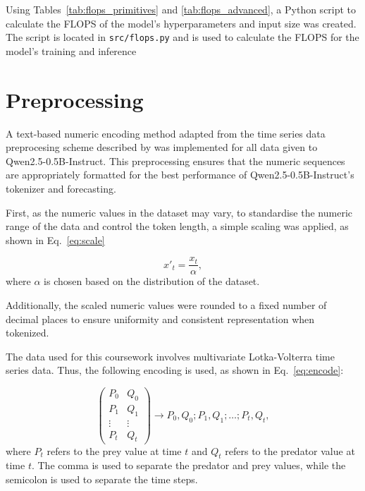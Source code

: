 \documentclass[11pt,a4paper]{article}
\begin{document}
Using Tables~\ref{tab:flops_primitives} and \ref{tab:flops_advanced}, a Python script to calculate the FLOPS of the model's hyperparameters and input size was created. The script is located in \texttt{src/flops.py} and is used to calculate the FLOPS for the model's training and inference 

\section{Preprocessing}
\label{zero}
A text-based numeric encoding method adapted from the time series data preprocesing scheme described by \citeauthor{gruver2024largelanguagemodelszeroshot} was implemented for all data given to Qwen2.5-0.5B-Instruct. This preprocessing ensures that the numeric sequences are appropriately formatted for the best performance of Qwen2.5-0.5B-Instruct's tokenizer and forecasting.

First, as the numeric values in the dataset may vary, to standardise the numeric range of the data and control the token length, a simple scaling was applied, as shown in Eq.~\ref{eq:scale}

\begin{equation}
    x'_t = \frac{x_t}{\alpha},
    \label{eq:scale}
\end{equation}
where $\alpha$ is chosen based on the distribution of the dataset.

Additionally, the scaled numeric values were rounded to a fixed number of decimal places to ensure uniformity and consistent representation when tokenized.

The data used for this coursework involves multivariate Lotka-Volterra time series data. Thus, the following encoding is used, as shown in Eq.~\ref{eq:encode}:

\begin{equation}
    \begin{pmatrix}
        P_0 & Q_0 \\
        P_1 & Q_1 \\
        \vdots & \vdots \\
        P_t & Q_t 
        \end{pmatrix}  
        \rightarrow P_0,Q_0;P_{1},Q_{1};\ldots;P_{t},Q_{t},
    \label{eq:encode}
\end{equation}
where $P_t$ refers to the prey value at time $t$ and $Q_t$ refers to the predator value at time $t$. The comma is used to separate the predator and prey values, while the semicolon is used to separate the time steps.
\end{document}
